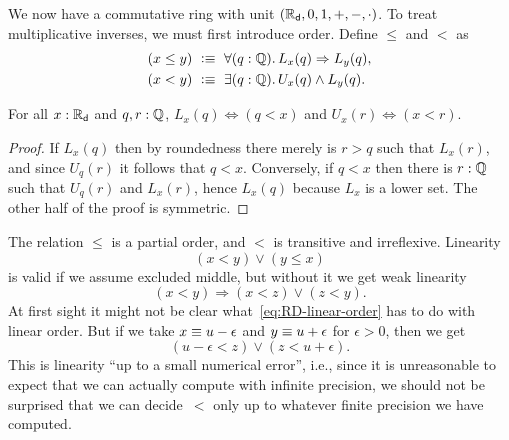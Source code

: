 We now have a commutative ring with unit
$(\mathbb{R}_\mathsf{d}, 0, 1, {+}, {-}, {\cdot})$. To treat
multiplicative inverses, we must first introduce order. Define $\leq$ and $<$ as
%
\begin{align*}
  (x \leq y) &\ \defeq \ \fall{q : \Q} L_x(q) \Rightarrow L_y(q), \\
  (x < y)    &\ \defeq \ \exis{q : \Q} U_x(q) \land L_y(q).
\end{align*}

\begin{lem} \label{dedekind-in-cut-as-le}
  For all $x : \mathbb{R}_\mathsf{d}$ and $q, r : \mathbb{Q}$, $L_x(q) \Leftrightarrow (q < x)$ and $U_x(r)
  \Leftrightarrow (x < r)$.
\end{lem}

\begin{proof}
  If $L_x(q)$ then by roundedness there merely is $r > q$ such that $L_x(r)$, and since
  $U_q(r)$ it follows that $q < x$. Conversely, if $q < x$ then there is $r : \mathbb{Q}$ such
  that $U_q(r)$ and $L_x(r)$, hence $L_x(q)$ because $L_x$ is a lower set. The other half
  of the proof is symmetric.
\end{proof}

The relation $\leq$ is a partial order, and $<$ is transitive and irreflexive. Linearity
%
\begin{equation*}
  (x < y) \lor (y \leq x)
\end{equation*}
%
is valid if we assume excluded middle, but without it we get weak linearity
%
\begin{equation} \label{eq:RD-linear-order}
  (x < y) \Rightarrow (x < z) \lor (z < y).
\end{equation}
%
At first sight it might not be clear what~\eqref{eq:RD-linear-order} has to do with
linear order. But if we take $x \equiv u - \epsilon$ and $y \equiv u + \epsilon$ for
$\epsilon > 0$, then we get
%
\begin{equation*}
  (u - \epsilon < z) \lor (z < u + \epsilon).
\end{equation*}
%
This is linearity ``up to a small numerical error'', i.e., since it is unreasonable to
expect that we can actually compute with infinite precision, we should not be surprised
that we can decide~$<$ only up to whatever finite precision we have computed.

